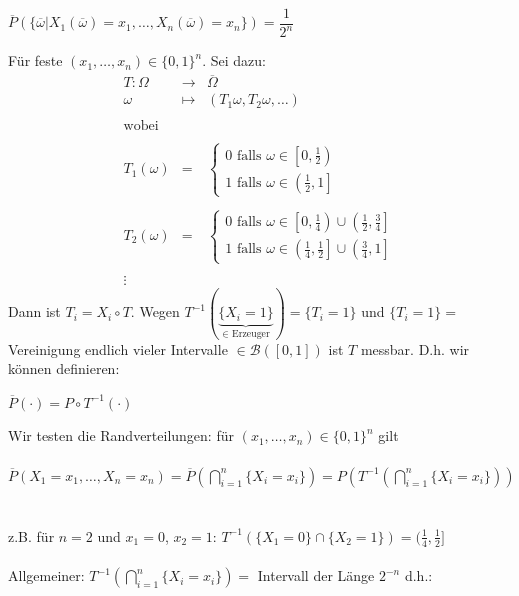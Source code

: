 \documentclass[10pt,a4paper]{report}
\numberwithin{equation}{section}
\numberwithin{figure}{section}
\theoremstyle{plain}
\theoremstyle{definition}
\theoremstyle{plain}
\theoremstyle{definition}
\theoremstyle{remark}
\theoremstyle{plain}
\begin{document}
\begin{center}
$\overline{P}(\{\overline{\omega}|X_1(\overline{\omega})=x_1,\dots,X_n(\overline{\omega})=x_n\})=\dfrac{1}{2^n}$
\end{center}
Für feste $(x_1,\dots,x_n) \in \{0,1\}^n$. Sei dazu:
\begin{eqnarray*}
T: \Omega &\to& \overline{\Omega}\\
\omega &\mapsto & (T_1\omega, T_2\omega,\dots)\\\\
\text{wobei}\\\\
T_1(\omega)&=&
\begin{cases}
0 \text{ falls } \omega \in \left[0,\frac{1}{2}\right)\\
1 \text{ falls } \omega \in \left(\frac{1}{2},1\right]
\end{cases}\\\\
T_2(\omega)&=&
\begin{cases}
0 \text{ falls } \omega \in \left[0,\frac{1}{4}\right)\cup \left(\frac{1}{2},\frac{3}{4}\right]\\
1 \text{ falls } \omega \in \left(\frac{1}{4},\frac{1}{2}\right]\cup\left(\frac{3}{4},1\right]
\end{cases}\\\\
\vdots
\end{eqnarray*}
Dann ist $T_i=X_i\circ T$. Wegen $T^{-1}(\underbrace{\{X_i=1\}}_{\in \text{ Erzeuger}})=\{T_i=1\}$ und $\{T_i=1\}=$ Vereinigung endlich vieler Intervalle $\in \mathcal{B}([0,1])$ ist $T$ messbar. D.h. wir können definieren:
\begin{center}
$\overline{P}(\cdot)=P\circ T^{-1}(\cdot)$
\end{center}
Wir testen die Randverteilungen: für $(x_1,\dots,x_n) \in \{0,1\}^n$ gilt\\\\
$\overline{P}(X_1=x_1,\dots,X_n=x_n)=\overline{P}\left(\bigcap\limits_{i=1}^n\{X_i=x_i\}\right)=P\left(T^{-1}\left(\bigcap\limits_{i=1}^n\{X_i=x_i\}\right)\right)$\\\\\\
z.B. für $n=2$ und $x_1=0$, $x_2=1$: $T^{-1}(\{X_1=0\}\cap\{X_2=1\})=(\frac{1}{4},\frac{1}{2}]$\\\\
Allgemeiner: $T^{-1}\left(\bigcap\limits_{i=1}^n\{X_i=x_i\}\right)=$ Intervall der Länge $2^{-n}$ d.h.:\\\\
\end{document}
